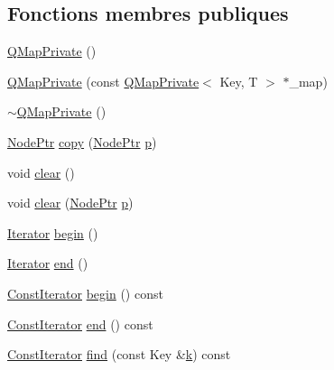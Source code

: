 \subsection*{Fonctions membres publiques}
\begin{DoxyCompactItemize}
\item 
\hyperlink{class_q_map_private_a4e52679058c7c68f4e188dbb1f81ddf2}{Q\+Map\+Private} ()
\item 
\hyperlink{class_q_map_private_a40c49fe36d6aac5a585ff81f219e484a}{Q\+Map\+Private} (const \hyperlink{class_q_map_private}{Q\+Map\+Private}$<$ Key, T $>$ $\ast$\+\_\+map)
\item 
\hyperlink{class_q_map_private_ae14c4d1bc4ed98e1ef41fae1db4f70ac}{$\sim$\+Q\+Map\+Private} ()
\item 
\hyperlink{class_q_map_private_a6b529a90a461f2d2df3e1b2356250fb4}{Node\+Ptr} \hyperlink{class_q_map_private_ac3ec38438d60e749d58dd6e8d87f8231}{copy} (\hyperlink{class_q_map_private_a6b529a90a461f2d2df3e1b2356250fb4}{Node\+Ptr} \hyperlink{060__command__switch_8tcl_a15229b450f26d8fa1c10bea4f3279f4d}{p})
\item 
void \hyperlink{class_q_map_private_a57cf7714f6cd6ce302f6869f61217e03}{clear} ()
\item 
void \hyperlink{class_q_map_private_a0317f0056ee635561c57577291950cba}{clear} (\hyperlink{class_q_map_private_a6b529a90a461f2d2df3e1b2356250fb4}{Node\+Ptr} \hyperlink{060__command__switch_8tcl_a15229b450f26d8fa1c10bea4f3279f4d}{p})
\item 
\hyperlink{class_q_map_private_a5326545ba578532909650c2f4a8d4d34}{Iterator} \hyperlink{class_q_map_private_a33ad6dc5d5c7c5292c6206445f7ec54a}{begin} ()
\item 
\hyperlink{class_q_map_private_a5326545ba578532909650c2f4a8d4d34}{Iterator} \hyperlink{class_q_map_private_ad1b27b1ce057ef786f0d122dc3e71d12}{end} ()
\item 
\hyperlink{class_q_map_private_a579a86f244015186e41bfa3cf85a5054}{Const\+Iterator} \hyperlink{class_q_map_private_a0f8a78064813598bd64a4988ebfc425a}{begin} () const 
\item 
\hyperlink{class_q_map_private_a579a86f244015186e41bfa3cf85a5054}{Const\+Iterator} \hyperlink{class_q_map_private_a6ff71c9267f089ba9dded6ee00e6f946}{end} () const 
\item 
\hyperlink{class_q_map_private_a579a86f244015186e41bfa3cf85a5054}{Const\+Iterator} \hyperlink{class_q_map_private_a72227a7d1023db02808ffb4e763b449a}{find} (const Key \&\hyperlink{060__command__switch_8tcl_a20363f854eb4098a446733d63d34dbc1}{k}) const 

\end{DoxyCompactItemize}
